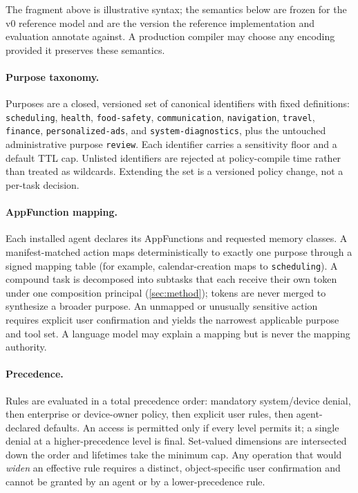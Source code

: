 The fragment above is illustrative syntax; the semantics below are frozen for the v0 reference model and are the version the reference implementation and evaluation annotate against. A production compiler may choose any encoding provided it preserves these semantics.

\paragraph{Purpose taxonomy.} Purposes are a closed, versioned set of canonical identifiers with fixed definitions: \texttt{scheduling}, \texttt{health}, \texttt{food-safety}, \texttt{communication}, \texttt{navigation}, \texttt{travel}, \texttt{finance}, \texttt{personalized-ads}, and \texttt{system-diagnostics}, plus the untouched administrative purpose \texttt{review}. Each identifier carries a sensitivity floor and a default TTL cap. Unlisted identifiers are rejected at policy-compile time rather than treated as wildcards. Extending the set is a versioned policy change, not a per-task decision.

\paragraph{AppFunction mapping.} Each installed agent declares its AppFunctions and requested memory classes. A manifest-matched action maps deterministically to exactly one purpose through a signed mapping table (for example, calendar-creation maps to \texttt{scheduling}). A compound task is decomposed into subtasks that each receive their own token under one composition principal (\cref{sec:method}); tokens are never merged to synthesize a broader purpose. An unmapped or unusually sensitive action requires explicit user confirmation and yields the narrowest applicable purpose and tool set. A language model may explain a mapping but is never the mapping authority.

\paragraph{Precedence.} Rules are evaluated in a total precedence order: mandatory system/device denial, then enterprise or device-owner policy, then explicit user rules, then agent-declared defaults. An access is permitted only if every level permits it; a single denial at a higher-precedence level is final. Set-valued dimensions are intersected down the order and lifetimes take the minimum cap. Any operation that would \emph{widen} an effective rule requires a distinct, object-specific user confirmation and cannot be granted by an agent or by a lower-precedence rule.

